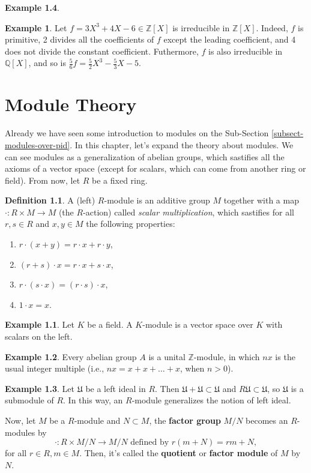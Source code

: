 \documentclass[11pt]{amsbook}%
\newcommand{\ii}{\item}
\theoremstyle{plain}
\theoremstyle{definition}
\newtheorem{definition*}{Definition}
\newtheorem*{example*}{Example}
\numberwithin{equation}{section}
\newcommand{\QQ}{\mathbb Q}
\newcommand{\ZZ}{\mathbb Z}
\newcommand{\UF}{\mathfrak U}
\begin{document}
\begin{example*}
\begin{example*}
  Let $f = 3X^{3} + 4X - 6 \in \ZZ[X]$ is irreducible in $\ZZ[X]$. Indeed, $f$ is primitive, 2 divides
  all the coefficients of $f$ except the leading coefficient, and 4 does not divide the constant
  coefficient. Futhermore, $f$ is also irreducible in $\QQ[X]$, and so is $\frac{5}{6}f = \frac{5}{2}X^{3} - \frac{5}{3}X - 5$.
\end{example*}


\chapter{Module Theory}
Already we have seen some introduction to modules on the Sub-Section \ref{subsect-modules-over-pid}. In this chapter, let's
expand the theory about modules. We can see modules as a generalization of abelian groups, which sastifies all the axioms
of a vector space (except for scalars, which can come from another ring or field). From now, let $R$ be a fixed ring.

\begin{definition*}
  \label{def-module}
  A (left) $R$-module is an additive group $M$ together with a map $\cdot: R \times M \longrightarrow M$ (the $R$-action) called
  \textit{scalar multiplication}, which sastifies for all $r, s \in R$ and $x, y \in M$ the following
  properties:
  \begin{enumerate}[1. ]
      \ii $r \cdot (x + y) = r \cdot x + r \cdot y$,
      \ii $(r + s) \cdot x = r \cdot x + s \cdot x$,
      \ii $r \cdot (s \cdot x) = (r \cdot s) \cdot x$,
      \ii $1 \cdot x = x$.
  \end{enumerate}
\end{definition*}

\begin{example*}
  Let $K$ be a field. A $K$-module is a vector space over $K$ with scalars on the left.
\end{example*}

\begin{example*}
  Every abelian group $A$ is a unital $\ZZ$-module, in which $nx$ is the usual integer multiple (i.e., $nx = x + x + \dots + x$, when $n > 0$).
\end{example*}

\begin{example*}
  Let $\UF$ be a left ideal in $R$. Then $\UF + \UF \subset \UF$ and $R \UF \subset \UF$, so $\UF$
  is a submodule of $R$. In this way, an $R$-module generalizes the notion of left ideal.
\end{example*}
Now, let $M$ be a $R$-module and $N \subset M$, the \textbf{factor group} $M/N$ becomes an $R$-modules by
$$
\cdot : R \times M/N \longrightarrow M/N \text{ defined by } r(m + N) = rm + N,
$$
for all $r \in R, m \in M$. Then, it's called the \textbf{quotient} or \textbf{factor module}
of $M$ by $N$.


\end{example*}
\end{document}

